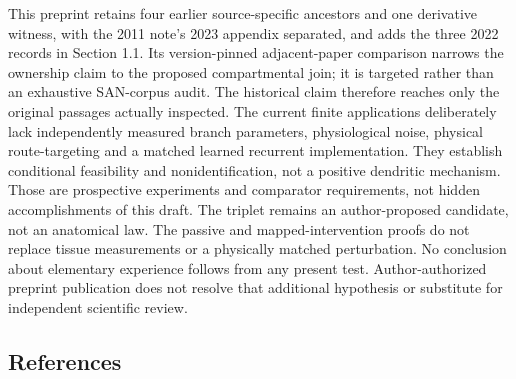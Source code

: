 \documentclass[
  american,
  11pt,
  letterpaper,
]{article}
\begin{document}
This preprint retains four earlier source-specific ancestors and one derivative witness, with the 2011 note's 2023 appendix separated, and adds the three 2022 records in Section 1.1. Its version-pinned adjacent-paper comparison narrows the ownership claim to the proposed compartmental join; it is targeted rather than an exhaustive SAN-corpus audit. The historical claim therefore reaches only the original passages actually inspected. The current finite applications deliberately lack independently measured branch parameters, physiological noise, physical route-targeting and a matched learned recurrent implementation. They establish conditional feasibility and nonidentification, not a positive dendritic mechanism. Those are prospective experiments and comparator requirements, not hidden accomplishments of this draft. The triplet remains an author-proposed candidate, not an anatomical law. The passive and mapped-intervention proofs do not replace tissue measurements or a physically matched perturbation. No conclusion about elementary experience follows from any present test. Author-authorized preprint publication does not resolve that additional hypothesis or substitute for independent scientific review.

\begingroup\small
\subsection{References}\label{references}
\end{document}
